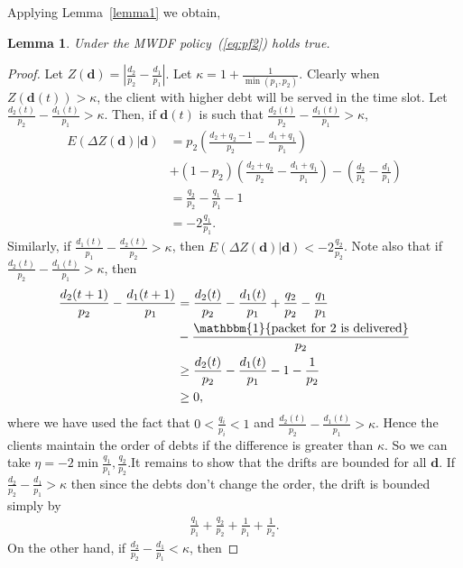 \documentclass[letterpaper, 10 pt, conference]{ieeeconf}
\newtheorem{lemma}{Lemma}
\begin{document}
 Applying Lemma~\ref{lemma1} we obtain,
 \begin{lemma}\label{lemma2}
 Under the MWDF policy~(\ref{eq:pf2}) holds true.
\end{lemma} 
\begin{proof} Let $Z(\bm{d})  =| \frac{d_{2} }{p_{2}}- \frac{ d_{1} }{p_{1}}| $. Let $\kappa = 1+ \frac{1}{\min(p_{1},p_{2}) }$. Clearly when $Z(\bm{d}(t)) > \kappa$, the client with higher debt will be served in the time slot. Let $\frac{d_{2}(t) }{p_{2}}- \frac{ d_{1}(t) }{p_{1}} > \kappa$. 
Then, if $\bm{d}(t)$ is such that $\frac{d_{2}(t)}{p_{2}}- \frac{d_{1}(t)}{p_{1}}>\kappa$,
\begin{align*}
E( \Delta Z(\bm{d}) | \bm{d} ) & = p_{2}   (\frac{d_{2}+q_{2}-1  }{p_{2}} - \frac{d_{1}+q_{1}  }{p_{1}})\\
&+ (1-p_{2}) (\frac{d_{2}+q_{2}  }{p_{2}} - \frac{d_{1}+q_{1}  }{p_{1}})- (\frac{d_{2} }{p_{2}} - \frac{d_{1} }{p_{1}})\\
& = \frac{q_{2} }{p_{2}}- \frac{q_{1}}{p_{1}} -1\\
&=-2\frac{q_{1}}{p_{1}}.
\end{align*}
Similarly, if $\frac{d_{1}(t)}{p_{1}}- \frac{d_{2}(t)}{p_{2}}>\kappa$, then $E( \Delta Z(\bm{d}) | \bm{d} ) <-2\frac{q_{2}}{p_{2}}$. Note also that if $\frac{d_{2}(t) }{p_{2}}- \frac{d_{1}(t)}{p_{1}} > \kappa$, then 
\begin{align*}
\frac{d_{2}(t+1) }{p_{2}}- \frac{d_{1}(t+1)}{p_{1}} &= \frac{d_{2}(t) }{p_{2}}- \frac{d_{1}(t)}{p_{1} }+ \frac{q_{2}}{p_{2}} -\frac{q_{1}}{p_{1}} \\
&-\frac{\mathbbm{1}\{\mbox{packet for $2$ is delivered}\} }{p_{2}}\\
&\geq \frac{d_{2}(t) }{p_{2}}- \frac{d_{1}(t)}{p_{1} } -1 - \frac{1}{p_{2}}\\
&\geq 0,
\end{align*}
where we have used the fact that $0<\frac{q_{i}}{p_{i}} <1$ and $\frac{d_{2}(t) }{p_{2}}- \frac{d_{1}(t)}{p_{1} } >\kappa$. Hence the clients maintain the order of debts if the difference is greater than $\kappa$. 
So we can take $\eta = -2\min{\frac{q_{1}}{p_{1}}, \frac{q_{2}}{p_{2}}}$.It remains to show that the drifts are bounded for all $\bm{d}$. If $ \frac{d_{2} }{p_{2}}- \frac{d_{1}}{p_{1}} > \kappa$ then since the debts don't change the order, the drift is bounded simply by 
\begin{align*}
\frac{q_{1}}{p_{1}} + \frac{q_{2}}{p_{2}} + \frac{1}{p_{1}} +\frac{1}{p_{2}}.
\end{align*}
On the other hand, if $ \frac{d_{2} }{p_{2}}- \frac{d_{1}}{p_{1}} < \kappa$, then

\end{proof}
\end{document}
